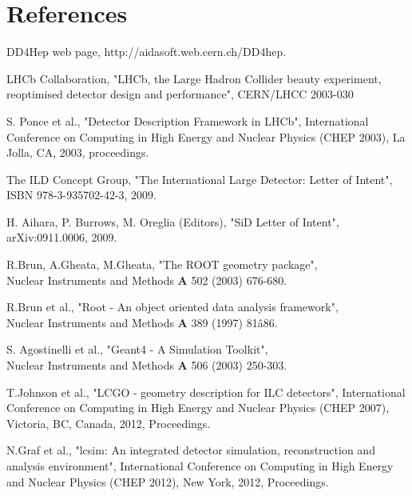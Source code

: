 \documentclass[a4paper]{jpconf}
\begin{document}
\section*{References}
\begin{thebibliography}{9}

  DD4Hep web page, http://aidasoft.web.cern.ch/DD4hep.

 		LHCb Collaboration, 
                "LHCb, the Large Hadron Collider beauty experiment, reoptimised detector 
				design and performance", CERN/LHCC 2003-030

 S. Ponce et al., 
                "Detector Description Framework in LHCb", 
                International Conference on Computing in High Energy and Nuclear Physics  (CHEP 2003), 
                La Jolla, CA, 2003, proceedings. 

  The ILD Concept Group, 
                   "The International Large Detector: Letter of Intent",\\
                   ISBN 978-3-935702-42-3, 2009.

  H. Aihara, P. Burrows, M. Oreglia (Editors),
                   "SiD Letter of Intent",
                   arXiv:0911.0006, 2009.

 R.Brun, A.Gheata, M.Gheata, "The ROOT geometry package",\\
                    Nuclear Instruments and Methods {\bf{A}} 502 (2003) 676-680.

 R.Brun et al., 
                   "Root - An object oriented data analysis framework",\\
                    Nuclear Instruments and Methods {\bf{A}} 389 (1997) 81â86.

  S. Agostinelli et al., 
                   "Geant4 - A Simulation Toolkit", \\
                    Nuclear Instruments and Methods {\bf{A}} 506 (2003) 250-303.

 T.Johnson et al., 
                   "LCGO - geometry description for ILC detectors", 
                   International Conference on Computing in High Energy and Nuclear Physics  (CHEP 2007), 
                   Victoria, BC, Canada, 2012, Proceedings.

 N.Graf et al., 
                   "lcsim: An integrated detector simulation, 
                   reconstruction and analysis environment", 
                   International Conference on Computing in High Energy and Nuclear Physics (CHEP 2012),
                   New York, 2012, Proceedings.


\end{thebibliography}
\end{document}

